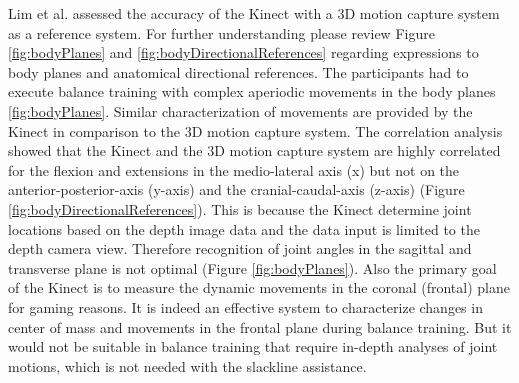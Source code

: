 Lim et al. \cite{Lim2015-pw} assessed the accuracy of the Kinect with a 3D motion capture system as a reference system. For further understanding please review Figure \ref{fig:bodyPlanes} and \ref{fig:bodyDirectionalReferences} regarding expressions to body planes and anatomical directional references. The participants had to execute balance training with complex aperiodic movements in the body planes \ref{fig:bodyPlanes}. Similar characterization of movements are provided by the Kinect in comparison to the 3D motion capture system. The correlation analysis showed that the Kinect and the 3D motion capture system are highly correlated for the flexion and extensions in the medio-lateral axis (x) but not on the anterior-posterior-axis (y-axis) and the cranial-caudal-axis (z-axis) (Figure \ref{fig:bodyDirectionalReferences}). This is because the Kinect determine joint locations based on the depth image data and the data input is limited to the depth camera view. Therefore recognition of joint angles in the sagittal and transverse plane is not optimal (Figure \ref{fig:bodyPlanes}). Also the primary goal of the Kinect is to measure the dynamic movements in the coronal (frontal) plane for gaming reasons. It is indeed an effective system to characterize changes in center of mass and movements in the frontal plane during balance training. But it would not be suitable in balance training that require in-depth analyses of joint motions, which is not needed with the slackline assistance.

